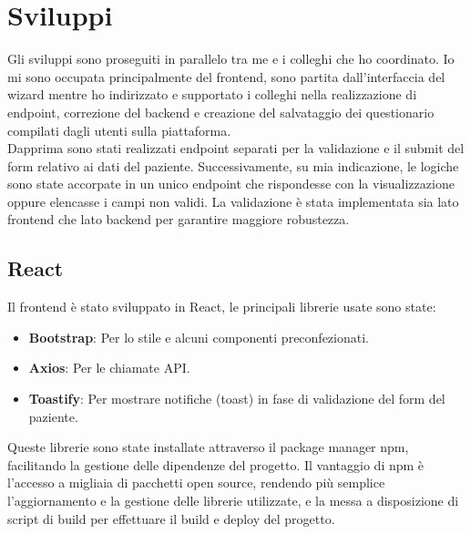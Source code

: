 \section{Sviluppi}
Gli sviluppi sono proseguiti in parallelo tra me e i colleghi che ho coordinato. Io mi sono occupata principalmente del frontend, sono partita dall'interfaccia del wizard mentre ho indirizzato e supportato i colleghi nella realizzazione di endpoint, correzione del backend e creazione del salvataggio dei questionario compilati dagli utenti sulla piattaforma.\\
Dapprima sono stati realizzati endpoint separati per la validazione e il submit del form relativo ai dati del paziente. Successivamente, su mia indicazione, le logiche sono state accorpate in un unico endpoint che rispondesse con la visualizzazione oppure elencasse i campi non validi. La validazione è stata implementata sia lato frontend che lato backend per garantire maggiore robustezza.\\

\subsection{React}
Il frontend è stato sviluppato in React, le principali librerie usate sono state:
\begin{itemize}
    \item \textbf{Bootstrap}: Per lo stile e alcuni componenti preconfezionati.
    \item \textbf{Axios}: Per le chiamate API.
    \item \textbf{Toastify}: Per mostrare notifiche (toast) in fase di validazione del form del paziente.
\end{itemize}

Queste librerie sono state installate attraverso il package manager npm, facilitando la gestione delle dipendenze del progetto. Il vantaggio di npm è l'accesso a migliaia di pacchetti open source, rendendo più semplice l'aggiornamento e la gestione delle librerie utilizzate, e la messa a disposizione di script di build per effettuare il build e deploy del progetto. 


